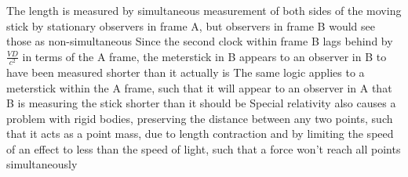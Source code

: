 \documentclass[11 pt, twoside]{article}
\newenvironment{outline*}
{
	\begin{outline}[enumerate]
	}
	{\end{outline}
}
\begin{document}
\begin{outline*}
\2 The length is measured by simultaneous measurement of both sides of the moving stick by stationary observers in frame A, but observers in frame B would see those as non-simultaneous
\2 Since the second clock within frame B lags behind by $\frac{VD}{c^2}$ in terms of the A frame, the meterstick in B appears to an observer in B to have been measured shorter than it actually is
\3 The same logic applies to a meterstick within the A frame, such that it will appear to an observer in A that B is measuring the stick shorter than it should be
\1 Special relativity also causes a problem with rigid bodies, preserving the distance between any two points, such that it acts as a point mass, due to length contraction and by limiting the speed of an effect to less than the speed of light, such that a force won't reach all points simultaneously
\end{outline*}
\end{document}

